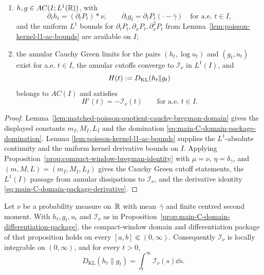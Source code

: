 \begin{proposition}
\begin{enumerate}
\[
\int_I\mathcal I_\nu(t)\dd t\le \frac{4C_I}{\pi}|I|;
\]
\item \(h,g\in AC(I;L^1(\mathbb{R}))\), with
\[
\partial_t h_t=(\partial_tP_t)*\nu,\qquad
\partial_t g_t=\partial_tP_t(\cdot-\bar\gamma)
\quad\text{for a.e. }t\in I,
\]
and the uniform \(L^1\) bounds for
\(\partial_tP_t,\partial_xP_t,\partial_x^2P_t\) from
Lemma~\ref{lem:poisson-kernel-l1-ac-bounds} are available on \(I\);
\item the annular Cauchy Green limits for the pairs
\((h_t,\log u_t)\) and \((g_t,u_t)\) exist for a.e. \(t\in I\), the annular
cutoffs converge to \(\mathcal I_\nu\) in \(L^1(I)\), and
\[
H(t):=D_{\rm KL}(h_t\|g_t)
\]
belongs to \(AC(I)\) and satisfies
\begin{equation}\label{eq:main-C-domain-package-derivative}
H'(t)=-\mathcal I_\nu(t)
\qquad\text{for a.e. }t\in I .
\end{equation}
\end{enumerate}
\end{proposition}

\begin{proof}
Lemma~\ref{lem:matched-poisson-quotient-cauchy-bregman-domain} gives the
displayed constants \(m_I,M_I,L_I\) and the domination
\eqref{eq:main-C-domain-package-domination}.  Lemma
\ref{lem:poisson-kernel-l1-ac-bounds} supplies the \(L^1\)-absolute
continuity and the uniform kernel derivative bounds on \(I\).  Applying
Proposition~\ref{prop:compact-window-bregman-identity} with
\(\mu=\nu\), \(\eta=\delta_{\bar\gamma}\), and
\((m,M,L)=(m_I,M_I,L_I)\) gives the Cauchy Green cutoff statements, the
\(L^1(I)\) passage from annular dissipations to \(\mathcal I_\nu\), and the
derivative identity \eqref{eq:main-C-domain-package-derivative}.
\end{proof}

\begin{theorem}%
\label{thm:poisson-kl-doob-tail}
\label{cor:poisson-kl-doob-bregman-tail}
Let $\nu$ be a probability measure on~$\mathbb{R}$ with mean~$\bar{\gamma}$ and finite
centred second moment.  With \(h_t,g_t,u_t\) and \(\mathcal I_\nu\) as in
Proposition~\ref{prop:main-C-domain-differentiation-package}, the compact-window
domain and differentiation package of that proposition holds on every
\([a,b]\Subset(0,\infty)\).  Consequently \(\mathcal I_\nu\) is locally
integrable on \((0,\infty)\), and for every \(t>0\),
\begin{equation}\label{eq:relative-entropy-integrated-dissipation}
D_{\mathrm{KL}}(h_t\|g_t)=\int_t^\infty \mathcal I_\nu(s)\dd s.
\end{equation}
\end{theorem}

